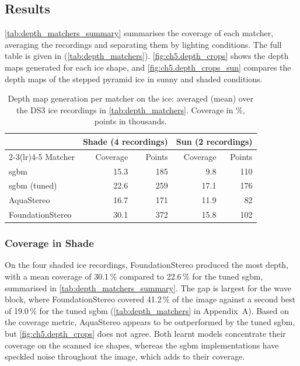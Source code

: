 \subsection{Results}
\label{subsec:ch5.depth_results}

\autoref{tab:depth_matchers_summary} summarises the coverage of each matcher, averaging the recordings and
separating them by lighting conditions. The full table is given in (\autoref{tab:depth_matchers}). \autoref{fig:ch5.depth_crops}
shows the depth maps generated for each ice shape, and \autoref{fig:ch5.depth_crops_sun} compares the depth maps of
the stepped pyramid ice in sunny and shaded conditions.

\begin{table}[H]
    \centering
    \caption{Depth map generation per matcher on the ice: averaged (mean) over the DS3 ice recordings in \autoref{tab:depth_matchers}.
    Coverage in \%,
    points in thousands.}
    \label{tab:depth_matchers_summary}
    \begin{tabular}{lrrrr}
        \toprule
                         & \multicolumn{2}{c}{Shade (4 recordings)} & \multicolumn{2}{c}{Sun (2 recordings)} \\
        \cmidrule(lr){2-3}\cmidrule(lr){4-5}
        Matcher          & Coverage & Points & Coverage & Points \\
        \midrule
        \acrshort{sgbm}             & 15.3     & 185    & 9.8      & 110    \\
        \acrshort{sgbm} (tuned)     & 22.6     & 259    & 17.1     & 176    \\
        AquaStereo       & 16.7     & 171    & 11.9     & 82     \\
        FoundationStereo & 30.1     & 372    & 15.8     & 102    \\
        \bottomrule
    \end{tabular}
\end{table}


\subsubsection{Coverage in Shade}

On the four shaded ice recordings, FoundationStereo produced the most depth, with a mean coverage of 30.1\,\% compared
to 22.6\,\% for the tuned \gls{sgbm}, summarised in \autoref{tab:depth_matchers_summary}. The gap is largest for the wave block, where FoundationStereo covered 41.2\,\% of the
image against a second best of 19.0\,\% for the tuned \gls{sgbm} (\autoref{tab:depth_matchers} in Appendix~A). Based on the coverage metric, AquaStereo appears to be
outperformed by the tuned \gls{sgbm}, but \autoref{fig:ch5.depth_crops} does not agree. Both learnt models
concentrate their coverage on the scanned ice shapes, whereas the \gls{sgbm} implementations have speckled noise throughout the image, which adds to their coverage.

